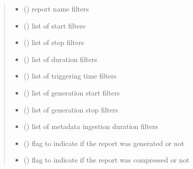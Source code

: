 \begin{fulllineitems}
\begin{fulllineitems}
\begin{quote}
\begin{description}
\begin{itemize}
\item {} 
 () \textendash{} report name filters

\item {} 
 () \textendash{} list of start filters

\item {} 
 () \textendash{} list of stop filters

\item {} 
 () \textendash{} list of duration filters

\item {} 
 () \textendash{} list of triggering time filters

\item {} 
 () \textendash{} list of generation start filters

\item {} 
 () \textendash{} list of generation stop filters

\item {} 
 () \textendash{} list of metadata ingestion duration filters

\item {} 
 () \textendash{} flag to indicate if the report was generated or not

\item {} 
 () \textendash{} flag to indicate if the report was compressed or not


\end{itemize}
\end{description}
\end{quote}
\end{fulllineitems}
\end{fulllineitems}
